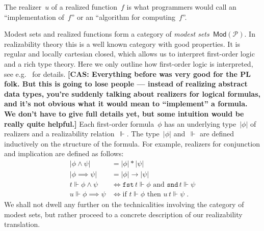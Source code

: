 \documentclass{article}
\newcommand{\ut}[1]{|#1|}
\newcommand{\PL}{\mathcal{P}}
\newcommand{\Mod}[1]{\mathsf{Mod}(#1)}
\newcommand{\rz}{\Vdash}
\newcommand{\fst}[1]{\texttt{fst}\,#1}
\newcommand{\snd}[1]{\texttt{snd}\,#1}
\newcommand{\comment}[1]{\textbf{[#1]}}
\begin{document}
The realizer~$u$ of a realized function~$f$ is what programmers would
call an ``implementation of~$f$'' or an ``algorithm for
computing~$f$''.

Modest sets and realized functions form a category of \emph{modest
  sets~$\Mod{\PL}$}. In realizability theory this is a well known
category with good properties. It is regular and locally cartesian
closed, which allows us to interpret first-order logic and a rich type
theory. Here we only outline how first-order logic is interpreted, see
e.g.~\cite{Bauer:00} for details.  \comment{CAS: Everything before was
  very good for the PL folk.  But this is going to lose people --- 
  instead of realizing abstract data types, you're suddenly
  talking about realizers for logical formulas, and it's not
  obvious what it would mean to ``implement'' a formula.  We don't have
  to give full details yet, but some intuition would be really quite helpful.}
Each first-order formula~$\phi$ has
an underlying type~$\ut{\phi}$ of realizers and a realizability
relation~$\rz$. The type~$\ut{\phi}$ and~$\rz$ are defined inductively
on the structure of the formula. For example, realizers for
conjunction and implication are defined as follows:
%
\begin{align*}
  \ut{\phi \land \psi} &= \ut{\phi} * \ut{\psi} \\
  \ut{\phi \implies \psi} &= \ut{\phi} \to \ut{\psi} \\
  t \rz \phi \land \psi &\iff \text{$\fst{t} \rz \phi$ and $\snd{t} \rz
    \psi$} \\
  u \rz \phi \implies \psi &\iff \text{if $t \rz \phi$ then $u\,t \rz
    \psi$}
  \;.
\end{align*}
%
We shall not dwell any further on the technicalities involving the
category of modest sets, but rather proceed to a concrete description
of our realizability translation.
\end{document}
